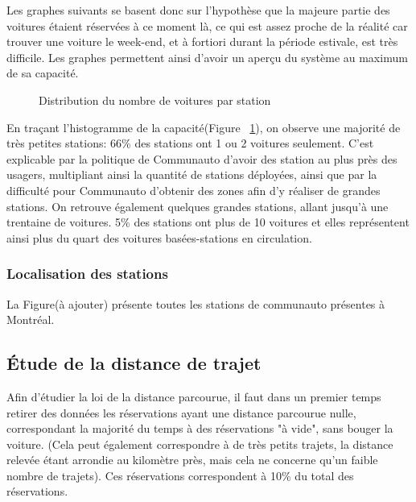 \documentclass[12pt,a4paper]{article}
\newcommand{\1}[1]{\mathbbm{1}_{\{#1\}} }
\theoremstyle{definition}
\begin{document}
{Les graphes suivants se basent donc sur l'hypothèse que la majeure partie des voitures étaient réservées à ce moment là, ce qui est assez proche de la réalité car trouver une voiture le week-end, et à fortiori durant la période estivale, est très difficile.
Les graphes permettent ainsi d'avoir un aperçu du système au maximum de sa capacité.


\begin{figure}[!h]
\centering
{}
\caption{Distribution du nombre de voitures par station}
\label{hist_capa}
\end{figure}


En traçant l'histogramme de la capacité(Figure~ \ref{hist_capa}), on observe une majorité de très petites stations: 66\% des stations ont 1 ou 2 voitures seulement. C'est explicable par la politique de Communauto d'avoir des station au plus près des usagers, multipliant ainsi la quantité de stations déployées, ainsi que par la difficulté pour Communauto d'obtenir des zones afin d'y réaliser de grandes stations.
On retrouve également quelques grandes stations, allant jusqu'à une trentaine de voitures. 5\% des stations ont plus de 10 voitures et elles représentent ainsi plus du quart des voitures basées-stations en circulation.

\subsubsection{Localisation des stations}

La Figure(à ajouter) présente toutes les stations de communauto présentes à Montréal.

\subsection{Étude de la distance de trajet}


Afin d'étudier la loi de la distance parcourue, il faut dans un premier temps retirer des données les réservations ayant une distance parcourue nulle, correspondant la majorité du temps à des réservations "à vide", sans bouger la voiture. (Cela peut également correspondre à de très petits trajets, la distance relevée étant arrondie au kilomètre près, mais cela ne concerne qu'un faible nombre de trajets). Ces réservations correspondent à 10\% du total des réservations.

}
\end{document}
